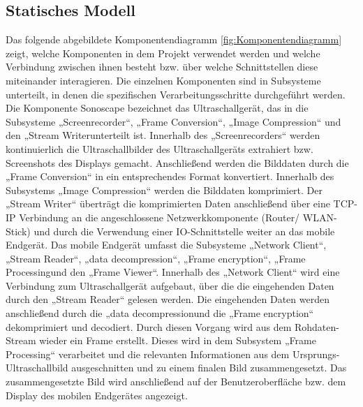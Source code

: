 \subsection{Statisches Modell}
Das folgende abgebildete Komponentendiagramm \ref{fig:Komponentendiagramm} zeigt, welche Komponenten in dem Projekt verwendet werden und welche Verbindung zwischen ihnen besteht bzw. über welche Schnittstellen diese miteinander interagieren. Die  einzelnen Komponenten sind in Subsysteme unterteilt, in denen die spezifischen Verarbeitungsschritte durchgeführt werden.  Die Komponente Sonoscape bezeichnet das Ultraschallgerät, das in die Subsysteme „Screenrecorder“, „Frame Conversion“, „Image Compression“ und den „Stream Writer\grqq unterteilt ist. Innerhalb des „Screenrecorders“ werden kontinuierlich die Ultraschallbilder des Ultraschallgeräts extrahiert bzw. Screenshots des Displays gemacht. Anschließend werden die Bilddaten durch die „Frame Conversion“ in ein entsprechendes Format konvertiert. Innerhalb des Subsystems „Image Compression“ werden die Bilddaten komprimiert. Der „Stream Writer“ überträgt die komprimierten Daten anschließend über eine TCP-IP Verbindung an die angeschlossene Netzwerkkomponente (Router/ WLAN-Stick) und durch die Verwendung einer IO-Schnittstelle weiter an das mobile Endgerät. Das mobile Endgerät umfasst die Subsysteme „Network Client“, „Stream Reader“, „data decompression“, „Frame encryption“, „Frame Processing\grqq und den „Frame Viewer“. Innerhalb des „Network Client“ wird eine Verbindung zum Ultraschallgerät aufgebaut, über die die eingehenden Daten durch den „Stream Reader“ gelesen werden. Die eingehenden Daten werden anschließend durch die „data decompression\grqq und die „Frame encryption“ dekomprimiert und  decodiert. Durch diesen Vorgang wird aus dem Rohdaten-Stream wieder ein Frame erstellt. Dieses wird in dem Subsystem „Frame Processing“ verarbeitet und die relevanten Informationen aus dem Ursprungs-Ultraschallbild ausgeschnitten und zu einem finalen Bild zusammengesetzt. Das zusammengesetzte Bild wird anschließend auf der Benutzeroberfläche bzw. dem Display des mobilen Endgerätes angezeigt. \\

